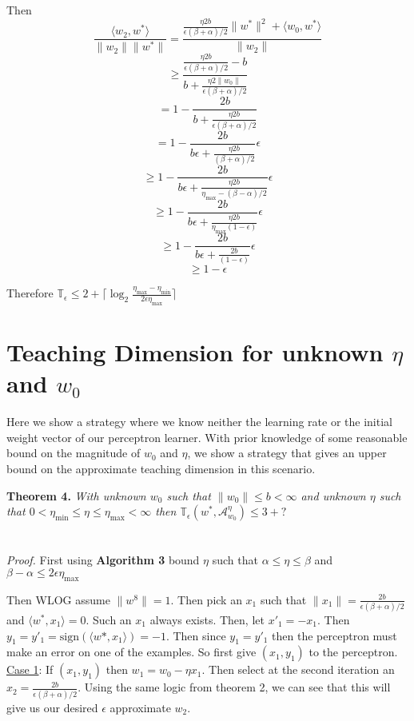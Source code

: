 \documentclass{article}
\newcommand{\learn}{\mathcal{A}_{w_0}^\eta}
\begin{document}
Then 
$$
\frac{\langle w_2, w^* \rangle}{\lVert w_2 \rVert \lVert w^* \rVert} = \frac{
\frac{\eta 2  b}{\epsilon (\beta + \alpha)/2} \lVert w^* \lVert ^2 + \langle w_0, w^* \rangle}{\lVert w_2 \rVert}
$$ 
$$
\geq \frac{\frac{\eta 2  b}{\epsilon (\beta + \alpha)/2} - b}{b +\frac{\eta 2  \lVert w_0 \rVert}{\epsilon (\beta + \alpha)/2} }
$$
$$
= 1 - \frac{2 b}{b +\frac{\eta 2  b}{\epsilon (\beta + \alpha)/2} }
$$
$$
= 1 - \frac{2b}{b \epsilon + \frac{\eta 2  b}{(\beta + \alpha)/2} } \epsilon
$$
$$
\geq  1 - \frac{2b}{b \epsilon + \frac{\eta 2  b}{\eta_{\max} - (\beta - \alpha) / 2} } \epsilon
$$
$$
\geq  1 - \frac{2b}{b \epsilon + \frac{\eta 2  b}{\eta_{\max} (1-\epsilon)} } \epsilon
$$
$$
\geq 1 - \frac{2b}{b \epsilon + \frac{ 2  b}{(1-\epsilon)} } \epsilon
$$
$$
\geq 1 - \epsilon
$$

Therefore 
$\mathbb{T}_\epsilon \leq  2 + \lceil \log_2 \frac{\eta_{\max} - \eta_{\min}}{2\epsilon\eta_{\max}}  \rceil$

\section{Teaching Dimension for unknown $\eta$ and $w_0$}
Here we show a strategy where we know neither the learning rate or the initial weight vector of our perceptron learner. With prior knowledge of some reasonable bound on the magnitude of $w_0$ and $\eta$, we show a strategy that gives an upper bound on the approximate teaching dimension in this scenario.

\textbf{Theorem 4.} 
\textit{With unknown $w_0$ such that $\lVert w_0 \rVert \leq b < \infty$
and unknown $\eta$ such that $0 < \eta_{\min} \leq \eta \leq \eta_{\max} < \infty$ then 
$
\mathbb{T}_\epsilon(w^* , \learn) \leq 3 + ?
$
}
\\
\\
\\
\textit{Proof.}
First using \textbf{Algorithm 3} bound $\eta$ such that $ \alpha \leq \eta \leq \beta$ and $\beta - \alpha \leq 2\epsilon \eta_{\max}$

Then WLOG assume $\lVert w^8 \rVert = 1$. Then pick an $x_1$ such that 
$\lVert x_1 \rVert = \frac{2b}{\epsilon (\beta + \alpha)/2}$ and $\langle w^*, x_1 \rangle = 0$. Such an $x_1$ always exists. Then, let $x'_1 = -x_1.$ Then $y_1 = y'_1 = \text{sign}(\langle w*, x_1 \rangle) = -1$.  Then since $y_1 = y'_1$ then the perceptron must make an error on one of the examples. So first give $(x_1, y_1)$ to the perceptron.
\underline{Case 1}: If $(x_1, y_1)$ then $w_1 = w_0 - \eta x_1$. 
Then select at the second iteration an $x_2 = \frac{2b}{\epsilon (\beta + \alpha)/2}$. Using the same logic from theorem 2, we can see that this will give us our desired $\epsilon$ approximate $w_2$. 
\end{document}
